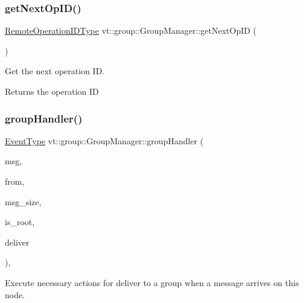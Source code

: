 \subsubsection{\texorpdfstring{get\+Next\+Op\+I\+D()}{getNextOpID()}}
{\footnotesize\ttfamily \hyperlink{namespacevt_1_1group_a73f2624ddeb535b39a08b6524f26b244}{Remote\+Operation\+I\+D\+Type} vt\+::group\+::\+Group\+Manager\+::get\+Next\+Op\+ID (\begin{DoxyParamCaption}{ }\end{DoxyParamCaption})}



Get the next operation ID. 

\begin{DoxyReturn}{Returns}
the operation ID 
\end{DoxyReturn}
\mbox{\label{structvt_1_1group_1_1_group_manager_ae0ce8441ff4ce04493ff029c2f7ba027}} 
\subsubsection{\texorpdfstring{group\+Handler()}{groupHandler()}}
{\footnotesize\ttfamily \hyperlink{namespacevt_a009267401def7ae8bf201892222d060f}{Event\+Type} vt\+::group\+::\+Group\+Manager\+::group\+Handler (\begin{DoxyParamCaption}\item[{\hyperlink{namespacevt_ab2b3d506ec8e8d1540aede826d84a239}{Msg\+Shared\+Ptr}$<$ \hyperlink{namespacevt_a44d0d4e144748f2b19a1cfd962f50338}{Base\+Msg\+Type} $>$ const \&}]{msg,  }\item[{\hyperlink{namespacevt_a866da9d0efc19c0a1ce79e9e492f47e2}{Node\+Type} const}]{from,  }\item[{\hyperlink{namespacevt_a408e86a8c7c89309b52907dc5a513924}{Msg\+Size\+Type} const}]{msg\+\_\+size,  }\item[{bool const}]{is\+\_\+root,  }\item[{bool $\ast$const}]{deliver }\end{DoxyParamCaption})\hspace{0.3cm}{\ttfamily [static]}, {\ttfamily [private]}}



Execute necessary actions for deliver to a group when a message arrives on this node. 


